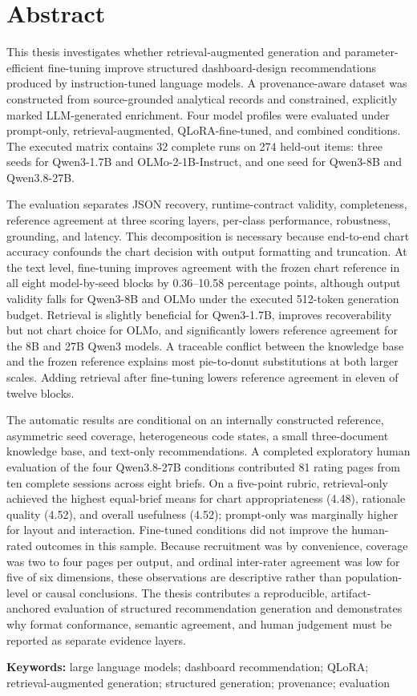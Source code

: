 \chapter*{Abstract}

This thesis investigates whether retrieval-augmented generation and parameter-efficient fine-tuning improve structured dashboard-design recommendations produced by instruction-tuned language models. A provenance-aware dataset was constructed from source-grounded analytical records and constrained, explicitly marked LLM-generated enrichment. Four model profiles were evaluated under prompt-only, retrieval-augmented, QLoRA-fine-tuned, and combined conditions. The executed matrix contains 32 complete runs on 274 held-out items: three seeds for Qwen3-1.7B and OLMo-2-1B-Instruct, and one seed for Qwen3-8B and Qwen3.8-27B.

The evaluation separates JSON recovery, runtime-contract validity, completeness, reference agreement at three scoring layers, per-class performance, robustness, grounding, and latency. This decomposition is necessary because end-to-end chart accuracy confounds the chart decision with output formatting and truncation. At the text level, fine-tuning improves agreement with the frozen chart reference in all eight model-by-seed blocks by 0.36--10.58 percentage points, although output validity falls for Qwen3-8B and OLMo under the executed 512-token generation budget. Retrieval is slightly beneficial for Qwen3-1.7B, improves recoverability but not chart choice for OLMo, and significantly lowers reference agreement for the 8B and 27B Qwen3 models. A traceable conflict between the knowledge base and the frozen reference explains most pie-to-donut substitutions at both larger scales. Adding retrieval after fine-tuning lowers reference agreement in eleven of twelve blocks.

The automatic results are conditional on an internally constructed reference, asymmetric seed coverage, heterogeneous code states, a small three-document knowledge base, and text-only recommendations. A completed exploratory human evaluation of the four Qwen3.8-27B conditions contributed 81 rating pages from ten complete sessions across eight briefs. On a five-point rubric, retrieval-only achieved the highest equal-brief means for chart appropriateness (4.48), rationale quality (4.52), and overall usefulness (4.52); prompt-only was marginally higher for layout and interaction. Fine-tuned conditions did not improve the human-rated outcomes in this sample. Because recruitment was by convenience, coverage was two to four pages per output, and ordinal inter-rater agreement was low for five of six dimensions, these observations are descriptive rather than population-level or causal conclusions. The thesis contributes a reproducible, artifact-anchored evaluation of structured recommendation generation and demonstrates why format conformance, semantic agreement, and human judgement must be reported as separate evidence layers.

\textbf{Keywords:} large language models; dashboard recommendation; QLoRA; retrieval-augmented generation; structured generation; provenance; evaluation
